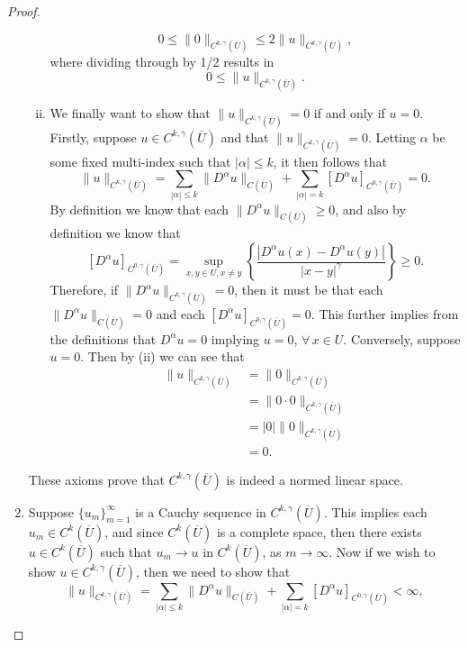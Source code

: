 \documentclass[11pt]{article}
\begin{document}
\begin{proof}
\begin{enumerate}[1.]
\begin{enumerate}[(i)]
					\[0 \leq \|0\|_{C^{k,\gamma}(\overline{U})} \leq 2\|u\|_{C^{k,\gamma}(\overline{U})},\]
					where dividing through by 1/2 results in
					\[0 \leq \|u\|_{C^{k,\gamma}(\overline{U})}.\]
				\item We finally want to show that $\|u\|_{C^{k,\gamma}(\overline{U})} = 0$ if and only if $u = 0$.
					Firstly, suppose $u \in C^{k,\gamma}(\overline{U})$ and that $\|u\|_{C^{k,\gamma}(\overline{U})} = 0$.
					Letting $\alpha$ be some fixed multi-index such that $|\alpha| \leq k$, it then follows that
					\[\|u\|_{C^{k,\gamma}(\overline{U})} = \sum_{|\alpha| \leq k}\|D^{\alpha}u\|_{C(\overline{U})} + \sum_{|\alpha| = k}[D^{\alpha}u]_{C^{0,\gamma}(\overline{U})} = 0.\]
					By definition we know that each $\|D^{\alpha}u\|_{C(\overline{U})} \geq 0$, and also by definition we know that
					\[[D^{\alpha}u]_{C^{0,\gamma}(\overline{U})} = \sup_{x,y \in U, x \not= y}{\left\{\frac{|D^{\alpha}u(x) - D^{\alpha}u(y)|}{|x-y|^{\gamma}}\right\}} \geq 0.\]
					Therefore, if $\|D^{\alpha}u\|_{C^{k,\gamma}(\overline{U})} = 0$, then it must be that each
					$\|D^{\alpha}u\|_{C(\overline{U})} = 0$ and each $[D^{\alpha}u]_{C^{0,\gamma}(\overline{U})} = 0$.
					This further implies from the definitions that $D^{\alpha}u = 0$ implying $u = 0$, $\forall \, x \in U$.
					Conversely, suppose $u = 0$. Then by (ii) we can see that
					\begin{align*}
						\|u\|_{C^{k,\gamma}(\overline{U})} &= \|0\|_{C^{k,\gamma}(\overline{U})} \\
										   &= \|0\cdot 0\|_{C^{k,\gamma}(\overline{U})} \\
										   &= |0|\|0\|_{C^{k,\gamma}(\overline{U})} \\
										   &= 0.
					\end{align*}
			\end{enumerate}
			These axioms prove that $C^{k,\gamma}(\overline{U})$ is indeed a normed linear space.
		\item Suppose $\{u_m\}_{m=1}^{\infty}$ is a Cauchy sequence in $C^{k,\gamma}(\overline{U})$.
            		This implies each $u_m \in C^k(\overline{U})$, and since $C^k(\overline{U})$ is a complete space,
			then there exists $u \in C^k(\overline{U})$ such that $u_m \rightarrow u$ in $C^k(\overline{U})$, as $m \rightarrow \infty$.
			Now if we wish to show $u \in C^{k,\gamma}(\overline{U})$, then we need to show that
			\[\|u\|_{C^{k,\gamma}(\overline{U})} = \sum_{|\alpha| \leq k}\|D^{\alpha}u\|_{C(\overline{U})} + \sum_{|\alpha| = k}[D^{\alpha}u]_{C^{0,\gamma}(\overline{U})} < \infty,\]

\end{enumerate}
\end{proof}
\end{document}
